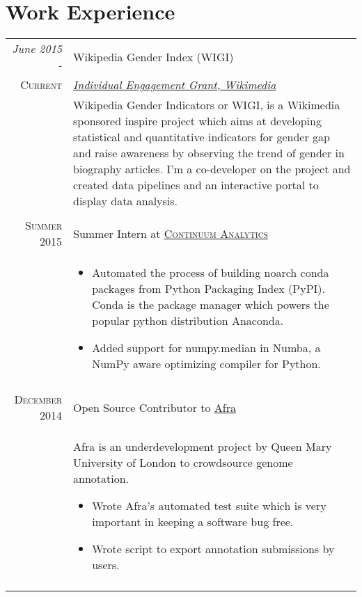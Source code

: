 \documentclass[a4paper,10pt]{article}
\begin{document}
\section{Work Experience}
\begin{tabular}{r|p{12cm}}


    \emph{June 2015 -} & Wikipedia Gender Index (WIGI) \\\textsc{Current}&
    \emph{\href{https://meta.wikimedia.org/wiki/Grants:IEG/WIGI:_Wikipedia_Gender_Index}{Individual
    Engagement Grant, Wikimedia}}\\& \footnotesize{ Wikipedia Gender Indicators
            or WIGI, is a Wikimedia sponsored inspire project which aims at
            developing statistical and quantitative indicators for gender gap
            and raise awareness by observing the trend of gender in biography
            articles. I'm a co-developer on the project and created data
            pipelines and an interactive portal to display data analysis.

}\\\multicolumn{2}{c}{} \\


\textsc{Summer 2015} & Summer Intern at
\textsc{\href{http://continuum.io/}{Continuum Analytics}}
    \emph{}\\&\footnotesize{
    \begin{itemize}
        \item Automated the process of building noarch conda packages from Python
    Packaging Index (PyPI). Conda is the package manager which powers the
    popular python distribution Anaconda.
        \item Added support for numpy.median in Numba, a NumPy aware optimizing compiler
    for Python.
    \end{itemize}

}\\\multicolumn{2}{c}{} \\



    \textsc{December 2014} & Open Source Contributor to \href{http://afra.sbcs.qmul.ac.uk/}{Afra}
    \emph{}\\&\footnotesize{Afra is an underdevelopment project by Queen Mary
    University of London to crowdsource genome annotation.
\begin{itemize}
        \item Wrote Afra's automated test suite which is very important in keeping a
software bug free.
        \item Wrote script to export annotation submissions by users.
\end{itemize}}\\\multicolumn{2}{c}{} \\





\end{tabular}
\end{document}
